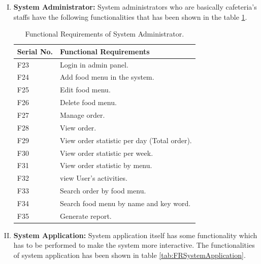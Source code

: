\begin{enumerate}[(I)]
\item \textbf{System Administrator:} System administrators who are basically
cafeteria's staffs have the following functionalities that has been shown in the
table \ref{tab:FRSystemAdministrator}.

\begin{table}[h!t]
\centering
 \begin{tabular}{| p{2cm} | p{10cm} |}
    \hline
    Serial No. & Functional Requirements \\ \hline
    F23 & Login in admin panel. \\ \hline
    F24 & Add food menu in the system. \\ \hline
    F25 & Edit food menu. \\ \hline
    F26 & Delete food menu. \\ \hline 
  	F27 & Manage order. \\ \hline 
    F28 & View order. \\ \hline 
    F29 & View order statistic per day (Total order). \\ \hline 
 	F30 & View order statistic per week. \\ \hline
 	F31 & View order statistic by menu. \\ \hline 
 	F32 & view User's activities. \\ \hline 
  	F33 & Search order by food menu. \\ \hline
  	F34 & Search food menu by name and key word. \\ \hline 
  	F35 & Generate report. \\ \hline 
    \end{tabular}
 \caption{Functional Requirements of System Administrator.}
\label{tab:FRSystemAdministrator}
\end{table}

\item \textbf{System Application:} System application itself has some
functionality which has to be performed to make the system more interactive. The
functionalities of system application has been shown in table
\ref{tab:FRSystemApplication}.


\end{enumerate}
